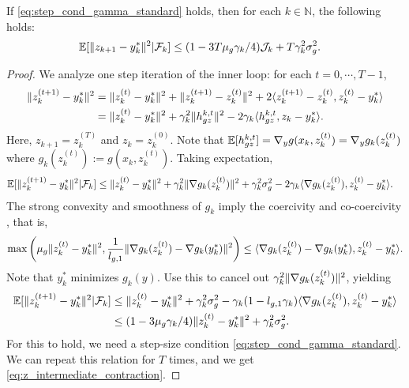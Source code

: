 \begin{lemma}
\label{lem:z_intermediate_contraction}
If \eqref{eq:step_cond_gamma_standard} holds, then for each $k \in \mathbb{N}$, the following holds:
\begin{align}
    \mathbb{E}[\|z_{k+1} - y_k^*\|^2 | \mathcal{F}_k] &\le (1 - 3 T \mu_g \gamma_k / 4) \mathcal{J}_k + T \gamma_k^2 \sigma_g^2. \label{eq:z_intermediate_contraction}
    \end{align}
\end{lemma}

\begin{proof}
We analyze one step iteration of the inner loop: for each $t = 0, \cdots, T-1$,
\begin{align*}
    \|z_{k}^{(t+1)} - y_k^*\|^2 &= \|z_{k}^{(t)} - y_k^*\|^2 + \|z_{k}^{(t+1)} - z_k^{(t)}\|^2 +  2\langle z_{k}^{(t+1)}-z_{k}^{(t)}, z_{k}^{(t)}-y_k^* \rangle \\
    &= \|z_{k}^{(t)} - y_k^*\|^2 + \gamma_k^2 \|h_{gz}^{k,t} \|^2 - 2\gamma_k \langle h_{gz}^{k,t}, z_{k}-y_k^* \rangle.
\end{align*}
Here, $z_{k+1} = z_{k}^{(T)}$ and $z_{k} = z_{k}^{(0)}$. Note that $\mathbb{E}[h_{gz}^{k,t}] = \nabla_y g(x_k, z_k^{(t)}) = \nabla_y g_k(z_k^{(t)})$ where $g_k(z_k^{(t)}):= g(x_k, z_k^{(t)})$. Taking expectation,
\begin{align*}
    \mathbb{E}[\|z_{k}^{(t+1)} - y_k^*\|^2 | \mathcal{F}_{k} ] &\le \|z_{k}^{(t)} - y_k^*\|^2 + \gamma_k^2 \|\nabla g_k (z_k^{(t)})\|^2 +  \gamma_k^2 \sigma_g^2 - 2\gamma_k \langle \nabla g_k(z_k^{(t)}), z_{k}^{(t)} -y_k^* \rangle.
\end{align*}
The strong convexity and smoothness of $g_k$ imply the coercivity and co-coercivity \cite{nesterov2018lectures}, that is,
\begin{align*}
    \max \left( \mu_g \|z_k^{(t)} -y_k^*\|^2, \frac{1}{l_{g,1}} \|\nabla g_k (z_k^{(t)}) - \nabla g_k(y_k^*)\|^2 \right) \le \langle \nabla g_k(z_k^{(t)}) - \nabla g_k(y_k^*), z_{k}^{(t)} - y_k^* \rangle.
\end{align*}
Note that $y_k^*$ minimizes $g_k(y)$. Use this to cancel out $\gamma_k^2 \|\nabla g_k (z_k^{(t)})\|^2$, yielding
\begin{align*}
    \mathbb{E}[\|z_{k}^{(t+1)} - y_k^*\|^2 | \mathcal{F}_k] &\le \|z_{k}^{(t)} - y_k^*\|^2 + \gamma_k^2 \sigma_g^2 - \gamma_k(1- l_{g,1} \gamma_k) \langle \nabla g_k(z_k^{(t)}), z_{k}^{(t)} -y_k^* \rangle \nonumber \\
    &\le (1 - 3 \mu_g \gamma_k / 4) \|z_{k}^{(t)} - y_k^*\|^2 + \gamma_k^2 \sigma_g^2.
\end{align*}
For this to hold, we need a step-size condition \eqref{eq:step_cond_gamma_standard}.
We can repeat this relation for $T$ times, and we get \eqref{eq:z_intermediate_contraction}.
\end{proof}






